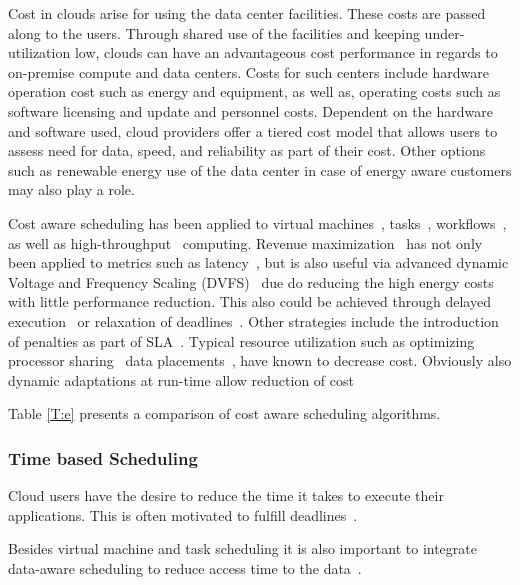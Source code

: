 \documentclass[final,5p,times,twocolumn]{elsarticle}
\begin{document}
Cost in clouds arise for using the data center facilities. These costs
are passed along to the users. Through shared use of the facilities
and keeping under-utilization low, clouds can have an advantageous
cost performance in regards to on-premise compute and data
centers. Costs for such centers include hardware operation cost such
as energy and equipment, as well as, operating costs such as software
licensing and update and personnel costs. Dependent on the hardware
and software used, cloud providers offer a tiered cost model that
allows users to assess need for data, speed, and reliability as part
of their cost.  Other options such as renewable energy use of the data
center in case of energy aware customers may also play a role.

Cost aware scheduling has been applied to virtual
machines~\cite{yuan2017ttsa},
tasks~\cite{yuan2017temporal,zuo2015multi},
workflows~\cite{arabnejad2015cost,arabnejad2016budget}, as well as
high-throughput~\cite{yuan2016cawsac} computing.  Revenue
maximization~\cite{yuan2018warm} has not only been applied to metrics
such as latency~\cite{ghahramani2017toward}, but is also useful via
advanced dynamic Voltage and Frequency Scaling
(DVFS)~\cite{las10cloudsched,calheiros2014energy} due do reducing the
high energy costs with little performance reduction. This also could
be achieved through delayed execution~\cite{bi2016trs} or relaxation
of deadlines~\cite{zhang2018dynamic}.  Other strategies include the
introduction of penalties as part of SLA~\cite{wu2012sla}. Typical
resource utilization such as optimizing processor
sharing~\cite{lee2012profit} data placements~\cite{lee2012profit},
have known to decrease cost. Obviously also dynamic
adaptations at run-time allow reduction of cost~\cite{ari2013design}

Table \ref{T:e} presents a comparison of cost aware scheduling algorithms.





\subsubsection{Time based Scheduling}\label{sec:time}



Cloud users have the desire to reduce the time it takes to execute
their applications. This is often motivated to fulfill
deadlines~\cite{arabnejad2017scheduling}.

Besides virtual machine and task scheduling it is also important to
integrate data-aware scheduling to reduce access time to the
data~\cite{vandenbosshe2013}.
\end{document}
